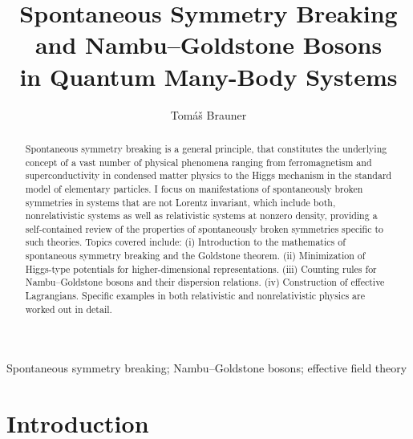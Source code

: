 \documentclass[final,3p,times,12pt,a4paper,sort&compress]{elsarticle}
\begin{document}
\begin{frontmatter}

\title{Spontaneous Symmetry Breaking and Nambu--Goldstone Bosons\\
in Quantum Many-Body Systems}

\author{Tom\'a\v{s} Brauner}
\address{Institute for Theoretical Physics, Goethe University, 60438
Frankfurt am Main, Germany}
\address{Department of Theoretical Physics, Nuclear Physics
Institute ASCR, 25068 \v{R}e\v{z}, Czech Republic}

\begin{abstract}
Spontaneous symmetry breaking is a general principle, that constitutes
the underlying concept of a vast number of physical phenomena ranging from
ferromagnetism and superconductivity in condensed matter physics to the Higgs
mechanism in the standard model of elementary particles. I focus on
manifestations of spontaneously broken symmetries in systems that are not
Lorentz invariant, which include both, nonrelativistic systems as well as
relativistic systems at nonzero density, providing a self-contained review of
the properties of spontaneously broken symmetries specific to such theories.
Topics covered include: (i) Introduction to the mathematics of spontaneous
symmetry breaking and the Goldstone theorem. (ii) Minimization of Higgs-type
potentials for higher-dimensional representations. (iii) Counting rules for
Nambu--Goldstone bosons and their dispersion relations. (iv) Construction of
effective Lagrangians. Specific examples in both relativistic and
nonrelativistic physics are worked out in detail.
\end{abstract}

\begin{keyword}
Spontaneous symmetry breaking; Nambu--Goldstone bosons; effective field
theory
\end{keyword}

\end{frontmatter}


\section{Introduction}
\label{sec:introduction}
\end{document}
